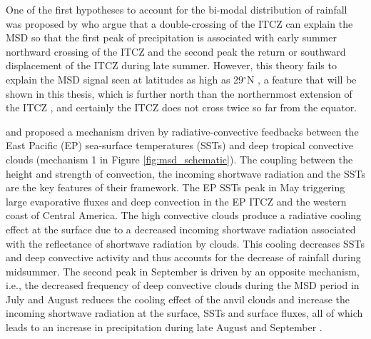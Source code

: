 
One of the first hypotheses to account for the bi-modal distribution of rainfall was proposed by \cite{hastenrath1967} who argue that a double-crossing of the ITCZ can explain the MSD so that the first peak of precipitation is associated with early summer northward crossing of the ITCZ and the second peak the return or southward displacement of the ITCZ during late summer.
However, this theory fails to explain the MSD signal seen at latitudes as high as 29$^\circ$N \citep{perdigon2018,zhao2020}, a feature that will be shown in this thesis, which is further north than the northernmost extension of the ITCZ \citep{schneider2014}, and certainly the ITCZ does not cross twice so far from the equator. %

\cite{magana1999} and \cite{magana2005} proposed a mechanism driven by radiative-convective feedbacks between the East Pacific (EP) sea-surface temperatures (SSTs) and deep tropical convective clouds (mechanism 1 in Figure \ref{fig:msd_schematic}). The coupling between the height and strength of convection, the incoming shortwave radiation and the SSTs are the key features of their framework. %
The EP SSTs peak in May triggering large evaporative fluxes and deep convection in the EP ITCZ and the western coast of Central America.
The high convective clouds produce a radiative cooling effect at the surface due to a decreased incoming shortwave radiation associated with the reflectance of shortwave radiation by clouds.
This cooling  decreases SSTs and deep convective activity and thus accounts for the decrease of rainfall during midsummer.
The second peak in September is driven by an opposite mechanism, i.e., the decreased frequency of deep convective clouds during the MSD period in July and August reduces the cooling effect of the anvil clouds and increase the incoming shortwave radiation at the surface, SSTs and surface fluxes, all of which leads to an increase in precipitation during late August and September \citep{magana1999}.


